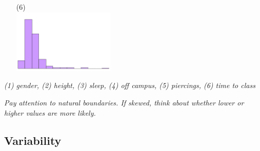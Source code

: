 \documentclass[12pt]{article}
\newcommand{\soln}[2]{\textit{\textcolor{custom_red}{#2}}}{}
\begin{document}
\begin{enumerate}
\begin{multicols}{3}
\begin{enumerate}
\item[(6)] $\:$ \\
\includegraphics[height=1.2in]{figures/time_to_class}

\end{enumerate}

\end{multicols}

\soln{1mm}{(1) gender, (2) height, (3) sleep, (4) off campus, (5) piercings, (6) time to class}

%


\end{enumerate}

\soln{2cm}{Pay attention to natural boundaries. If skewed, think about whether lower or higher values are more likely.}

%

\subsection*{Variability}
\end{document}
